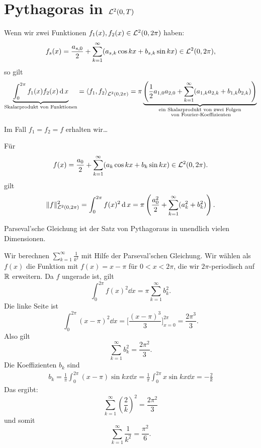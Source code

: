 \section{Pythagoras in $\mathcal{L}^2(0,T)$}

\begin{bem}
	Wenn wir zwei Funktionen $f_1(x), f_2(x) \in \mathcal{L}^2(0,2 \pi)$ haben: 
	\[
		f_s(x) = \frac{a_{s,0}}{2} + \sum_{k=1}^\infty (a_{s,k} \cos k x + b_{s,k} \sin k x) \in \mathcal{L}^2(0,2 \pi),
	\]
	so gilt 
	\[
		\underbrace{\int_0^{2\pi} f_1(x) f_2(x) \operatorname{d} x}_{\text{Skalarprodukt von Funktionen}} = \left< f_1 , f_2 \right>_{\mathcal{L}^2(0,2\pi)} = \pi \underbrace{\left( \frac{1}{2} a_{1,0} a_{2,0} + \sum_{k=1}^\infty (a_{1,k} a_{2,k} + b_{1,k} b_{2,k})\right)}_{\substack{\text{ein Skalarprodukt von zwei Folgen} \\ \text{ von Fourier-Koeffizienten}}}
	\]
	
	Im Fall $f_1=f_2=f$ erhalten wir\ldots 
\end{bem} 

\begin{thm}
	Für 
	\[
		f(x) = \frac{a_0}{2} + \sum_{k=1}^\infty (a_k \cos k x + b_k \sin k x) \in \mathcal{L}^2(0,2 \pi). 
	\]
	gilt
	\[
		\|f \|_{\mathcal{L}^2(0,2 \pi)}^2 = \int_0^{2 \pi} f(x)^2 \operatorname{d} x =\pi \left( \frac{a_0^2}{2} + \sum_{k=1}^\infty (a_k^2 + b_k^2 ) \right).
	\]
\end{thm} 

\begin{bem} Parseval'sche Gleichung ist der Satz von Pythagoraus in unendlich vielen Dimensionen. 
\end{bem} 

\begin{bsp}
	Wir berechnen $\sum_{k=1}^\infty \frac{1}{k^2}$  mit Hilfe der Parseval'schen Gleichung. Wir wählen als $f(x)$ die Funktion mit $f(x) = x- \pi$ für $0 < x < 2 \pi$, die wir $2\pi$-periodisch auf $\mathbb{R}$ erweitern. Da $f$ ungerade ist, gilt 
	\[
		\int_0^{2 \pi} f(x)^2 \dd x = \pi \sum_{k=1}^\infty b_k^2.
	\]
	Die linke Seite ist 
	\[
		\int_0^{2 \pi} (x-\pi)^2 \dd x = \biggl[ \frac{(x-\pi)^3}{3} \biggr]_{x=0}^{2 \pi} = \frac{2 \pi^3}{3}. 
	\]
	Also gilt 
	\[
		\sum_{k=1}^\infty b_k^2 = \frac{2 \pi^2}{3}.
	\]
	Die Koeffizienten $b_k$ sind 
	\begin{align*}
		b_k = \frac{1}{\pi} \int_0^{2 \pi} (x-\pi) \sin k x \dd x = \frac{1}{\pi} \int_0^{2 \pi} x \sin k x \dd x = - \frac{2}{k} 
	\end{align*}
	Das ergibt: 
	\[
		\sum_{k=1}^\infty \left( \frac{2}{k} \right)^2 = \frac{2 \pi^2}{3}
	\]
	und somit 
	\[
		\sum_{k=1}^\infty \frac{1}{k^2}  = \frac{\pi^2}{6}.
	\]
\end{bsp} 

